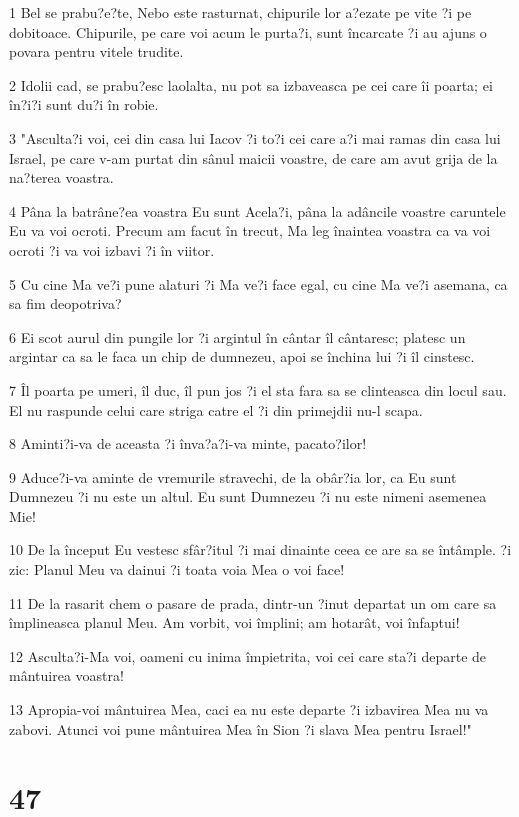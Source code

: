 \par 1 Bel se prabu?e?te, Nebo este rasturnat, chipurile lor a?ezate pe vite ?i pe dobitoace. Chipurile, pe care voi acum le purta?i, sunt încarcate ?i au ajuns o povara pentru vitele trudite.
\par 2 Idolii cad, se prabu?esc laolalta, nu pot sa izbaveasca pe cei care îi poarta; ei în?i?i sunt du?i în robie.
\par 3 "Asculta?i voi, cei din casa lui Iacov ?i to?i cei care a?i mai ramas din casa lui Israel, pe care v-am purtat din sânul maicii voastre, de care am avut grija de la na?terea voastra.
\par 4 Pâna la batrâne?ea voastra Eu sunt Acela?i, pâna la adâncile voastre caruntele Eu va voi ocroti. Precum am facut în trecut, Ma leg înaintea voastra ca va voi ocroti ?i va voi izbavi ?i în viitor.
\par 5 Cu cine Ma ve?i pune alaturi ?i Ma ve?i face egal, cu cine Ma ve?i asemana, ca sa fim deopotriva?
\par 6 Ei scot aurul din pungile lor ?i argintul în cântar îl cântaresc; platesc un argintar ca sa le faca un chip de dumnezeu, apoi se închina lui ?i îl cinstesc.
\par 7 Îl poarta pe umeri, îl duc, îl pun jos ?i el sta fara sa se clinteasca din locul sau. El nu raspunde celui care striga catre el ?i din primejdii nu-l scapa.
\par 8 Aminti?i-va de aceasta ?i înva?a?i-va minte, pacato?ilor!
\par 9 Aduce?i-va aminte de vremurile stravechi, de la obâr?ia lor, ca Eu sunt Dumnezeu ?i nu este un altul. Eu sunt Dumnezeu ?i nu este nimeni asemenea Mie!
\par 10 De la început Eu vestesc sfâr?itul ?i mai dinainte ceea ce are sa se întâmple. ?i zic: Planul Meu va dainui ?i toata voia Mea o voi face!
\par 11 De la rasarit chem o pasare de prada, dintr-un ?inut departat un om care sa împlineasca planul Meu. Am vorbit, voi împlini; am hotarât, voi înfaptui!
\par 12 Asculta?i-Ma voi, oameni cu inima împietrita, voi cei care sta?i departe de mântuirea voastra!
\par 13 Apropia-voi mântuirea Mea, caci ea nu este departe ?i izbavirea Mea nu va zabovi. Atunci voi pune mântuirea Mea în Sion ?i slava Mea pentru Israel!"

\chapter{47}

